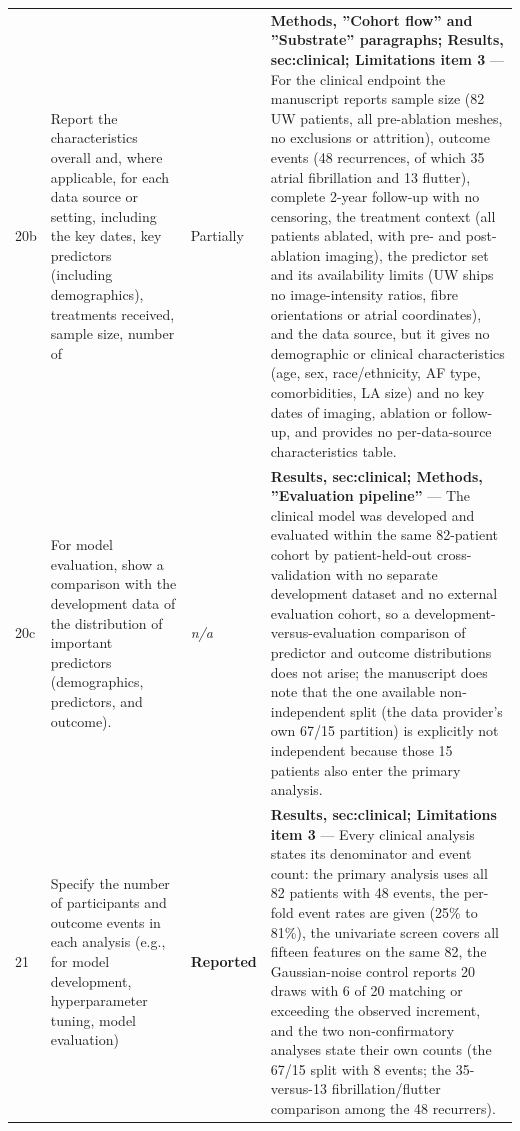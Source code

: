 \documentclass[10pt]{article}
\begin{document}
\begin{longtable}{@{}p{0.9cm} p{6.2cm} p{1.9cm} p{12.4cm}@{}}
20b & Report the characteristics overall and, where applicable, for each data source or setting, including the key dates, key predictors (including demographics), treatments received, sample size, number of & Partially & \textbf{Methods, ''Cohort flow'' and ''Substrate'' paragraphs; Results, sec:clinical; Limitations item 3} --- For the clinical endpoint the manuscript reports sample size (82 UW patients, all pre-ablation meshes, no exclusions or attrition), outcome events (48 recurrences, of which 35 atrial fibrillation and 13 flutter), complete 2-year follow-up with no censoring, the treatment context (all patients ablated, with pre- and post-ablation imaging), the predictor set and its availability limits (UW ships no image-intensity ratios, fibre orientations or atrial coordinates), and the data source, but it gives no demographic or clinical characteristics (age, sex, race/ethnicity, AF type, comorbidities, LA size) and no key dates of imaging, ablation or follow-up, and provides no per-data-source characteristics table. \\[2pt]
20c & For model evaluation, show a comparison with the development data of the distribution of important predictors (demographics, predictors, and outcome). & \emph{n/a} & \textbf{Results, sec:clinical; Methods, ''Evaluation pipeline''} --- The clinical model was developed and evaluated within the same 82-patient cohort by patient-held-out cross-validation with no separate development dataset and no external evaluation cohort, so a development-versus-evaluation comparison of predictor and outcome distributions does not arise; the manuscript does note that the one available non-independent split (the data provider's own 67/15 partition) is explicitly not independent because those 15 patients also enter the primary analysis. \\[2pt]
21 & Specify the number of participants and outcome events in each analysis (e.g., for model development, hyperparameter tuning, model evaluation) & \textbf{Reported} & \textbf{Results, sec:clinical; Limitations item 3} --- Every clinical analysis states its denominator and event count: the primary analysis uses all 82 patients with 48 events, the per-fold event rates are given (25\% to 81\%), the univariate screen covers all fifteen features on the same 82, the Gaussian-noise control reports 20 draws with 6 of 20 matching or exceeding the observed increment, and the two non-confirmatory analyses state their own counts (the 67/15 split with 8 events; the 35-versus-13 fibrillation/flutter comparison among the 48 recurrers). \\[2pt]

\end{longtable}
\end{document}
